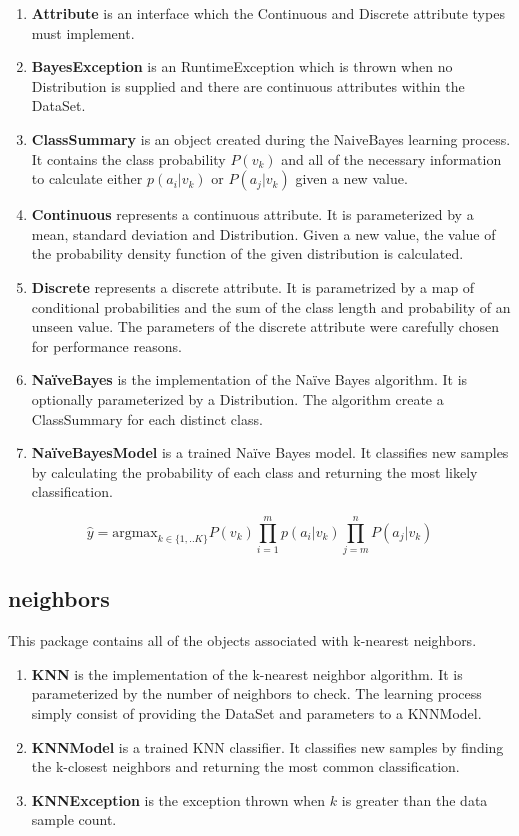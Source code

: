 \documentclass[11pt]{article}
\newcommand{\bb}{\textbf}
\begin{document}
\begin{enumerate}[leftmargin=*]
  \item[] \bb{Attribute} is an interface which the Continuous and Discrete attribute types must implement.
  \item[] \bb{BayesException} is an RuntimeException which is thrown when no Distribution is supplied and there are continuous attributes within the DataSet.
  \item[] \bb{ClassSummary} is an object created during the NaiveBayes learning process. It contains the class probability $P(v_k)$ and all of the necessary information to calculate either $p(a_i|v_k)$ or $P(a_j|v_k)$ given a new value.
  \item[] \bb{Continuous} represents a continuous attribute. It is parameterized by a mean, standard deviation and Distribution. Given a new value, the value of the probability density function of the given distribution is calculated.
  \item[] \bb{Discrete} represents a discrete attribute. It is parametrized by a map of conditional probabilities and the sum of the class length and probability of an unseen value. The parameters of the discrete attribute were carefully chosen for performance reasons.
  \item[] \bb{NaïveBayes} is the implementation of the Naïve Bayes algorithm. It is optionally parameterized by a Distribution. The algorithm create a ClassSummary for each distinct class.
  \item[] \bb{NaïveBayesModel} is a trained Naïve Bayes model. It classifies new samples by calculating the probability of each class and returning the most likely classification.
\end{enumerate}

$$\hat{y}= \mathrm{argmax}_{k\in\{1,..K\}} P(v_k)\prod_{i=1}^mp\left(a_i|v_k\right)\prod_{j=m}^nP\left(a_j|v_k\right)$$

\subsection{neighbors}
This package contains all of the objects associated with k-nearest neighbors.

\begin{enumerate}[leftmargin=*]
  \item[] \bb{KNN} is the implementation of the k-nearest neighbor algorithm. It is parameterized by the number of neighbors to check. The learning process simply consist of providing the DataSet and parameters to a KNNModel.
  \item[] \bb{KNNModel} is a trained KNN classifier. It classifies new samples by finding the k-closest neighbors and returning the most common classification.
  \item[] \bb{KNNException} is the exception thrown when $k$ is greater than the data sample count.
\end{enumerate}
\end{document}
